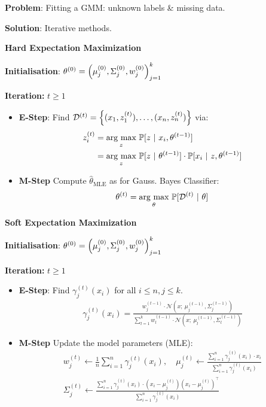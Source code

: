 \textbf{Problem}: Fitting a GMM: unknown labels \& missing data.

\textbf{Solution}: Iterative methods.\\

\method \textbf{Hard Expectation Maximization}\\

\textbf{Initialisation}: $\theta^{(0)} = \Bigl( \mu_j^{(0)}, \Sigma_j^{(0)}, w_j^{(0)} \Bigr)_{j=1}^k$

\textbf{Iteration:} $t \geq 1$
\begin{itemize}
    \item \textbf{E-Step}: Find $ \mathcal{D}^{(t)} = \Bigl\{ (x_1, z_1^{(t)}),\ldots, (x_n, z_n^{(t)}) \Bigr\}$ via:
    \begin{align*}
        z_i^{(t)}   &= \underset{z}{\text{arg max}}\ \mathbb{P}[z \ |\  x_i, \theta^{(t-1)}] \\
                    &= \underset{z}{\text{arg max}}\ \mathbb{P}[z \ |\  \theta^{(t-1)}]\cdot\mathbb{P}[x_i \ |\  z, \theta^{(t-1)}]
    \end{align*}
    \item \textbf{M-Step} Compute $\hat{\theta}_\text{MLE}$ as for Gauss. Bayes Classifier:
    \begin{align*}
        \theta^{(t)} = \underset{\theta}{\text{arg max}}\ \P[\mathcal{D}^{(t)} \sep  \theta]
    \end{align*}
\end{itemize}

\method \textbf{Soft Expectation Maximization}\\

\textbf{Initialisation}: $\theta^{(0)} = \Bigl( \mu_j^{(0)}, \Sigma_j^{(0)}, w_j^{(0)} \Bigr)_{j=1}^k$

\textbf{Iteration:} $t \geq 1$
\begin{itemize}
    \item \textbf{E-Step}: Find $\gamma_j^{(t)}(x_i)$ for all $i\leq n,j\leq k$.\\
    \begin{align*}
        \gamma_j^{(t)}(x_i) = \frac{w_j^{(t-1)}\cdot\mathcal{N}(x;\ \mu_j^{(t-1)}, \Sigma_j^{(t-1)})}{\sum_{l=1}^k w_l^{(t-1)}\cdot\mathcal{N}(x;\ \mu_l^{(t-1)}, \Sigma_l^{(t-1)})}
    \end{align*}
    \item \textbf{M-Step} Update the model parameters (MLE):
    \begin{align*}
        w_j^{(t)} \gets \frac{1}{n}\sum_{i=1}^{n}\gamma_j^{(t)}(x_i),\quad \mu_j^{(t)} \gets \frac{\sum_{i=1}^{n}\gamma_j^{(t)}(x_i)\cdot x_i}{\sum_{i=1}^{n}\gamma_j^{(t)}(x_i)} \\
        \Sigma_j^{(t)} \gets \frac{\sum_{i=1}^{n} \gamma_j^{(t)}(x_i)\cdot(x_i-\mu_j^{(t)})(x_i-\mu_j^{(t)})^\top}{\sum_{i=1}^{n}\gamma_j^{(t)}(x_i)}
    \end{align*}
\end{itemize}

